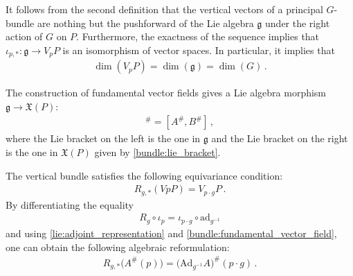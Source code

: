     \begin{property}[Dimension]\label{bundle:vertical_dimension}
        It follows from the second definition that the vertical vectors of a principal $G$-bundle are nothing but the pushforward of the Lie algebra $\mathfrak{g}$ under the right action of $G$ on $P$. Furthermore, the exactness of the sequence implies that $\iota_{p,\ast}:\mathfrak{g}\rightarrow V_pP$ is an isomorphism of vector spaces. In particular, it implies that
        \begin{gather}
            \dim(V_pP) = \dim(\mathfrak{g}) = \dim(G)\,.
        \end{gather}
    \end{property}


    \begin{property}
        The construction of fundamental vector fields gives a Lie algebra morphism $\mathfrak{g}\rightarrow\mathfrak{X}(P)$:
        \begin{gather}
            [A,B]^\# = [A^\#,B^\#]\,,
        \end{gather}
        where the Lie bracket on the left is the one in $\mathfrak{g}$ and the Lie bracket on the right is the one in $\mathfrak{X}(P)$ given by \cref{bundle:lie_bracket}.
    \end{property}

    \begin{property}\label{bundle:vert_g_equivariance}
        The vertical bundle satisfies the following equivariance condition:
        \begin{gather}
            R_{g,\ast}(VpP) = V_{p\cdot g}P\,.
        \end{gather}
        By differentiating the equality
        \begin{gather}
            R_g\circ\iota_p = \iota_{p\cdot g}\circ\mathrm{ad}_{g^{-1}}
        \end{gather}
        and using \cref{lie:adjoint_representation} and \cref{bundle:fundamental_vector_field}, one can obtain the following algebraic reformulation:
        \begin{gather}
            R_{g,\ast}\bigl(A^\#(p)\bigr) = \bigl(\mathrm{Ad}_{g^{-1}}A\bigr)^\#(p\cdot g)\,.
        \end{gather}
    \end{property}


